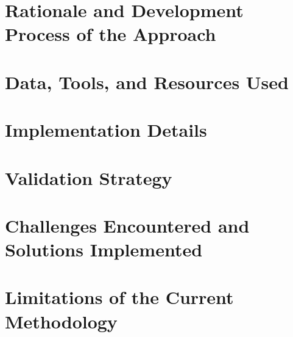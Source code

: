 \section{Rationale and Development Process of the Approach}

\section{Data, Tools, and Resources Used}

\section{Implementation Details}

\section{Validation Strategy}

\section{Challenges Encountered and Solutions Implemented}

\section{Limitations of the Current Methodology}


